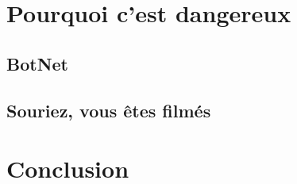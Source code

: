 \documentclass[a4paper]{report}
\begin{document}
	\newpage	
	
	\section{Pourquoi c'est dangereux}
	\subsection{BotNet}
	\subsection{Souriez, vous êtes filmés}
	
	\section{Conclusion}
\end{document}
